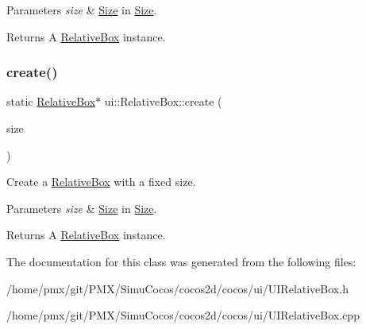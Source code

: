 \begin{DoxyParams}{Parameters}
{\em size} & \hyperlink{classSize}{Size} in {\ttfamily \hyperlink{classSize}{Size}}. \\
\hline
\end{DoxyParams}
\begin{DoxyReturn}{Returns}
A \hyperlink{classui_1_1RelativeBox}{Relative\+Box} instance. 
\end{DoxyReturn}
\mbox{\label{classui_1_1RelativeBox_a2e368badd32439b98017bcd362e5c413}} 
\subsubsection{\texorpdfstring{create()}{create()}\hspace{0.1cm}{\footnotesize\ttfamily [4/4]}}
{\footnotesize\ttfamily static \hyperlink{classui_1_1RelativeBox}{Relative\+Box}$\ast$ ui\+::\+Relative\+Box\+::create (\begin{DoxyParamCaption}\item[{const \hyperlink{classSize}{Size} \&}]{size }\end{DoxyParamCaption})\hspace{0.3cm}{\ttfamily [static]}}



Create a \hyperlink{classui_1_1RelativeBox}{Relative\+Box} with a fixed size. 


\begin{DoxyParams}{Parameters}
{\em size} & \hyperlink{classSize}{Size} in {\ttfamily \hyperlink{classSize}{Size}}. \\
\hline
\end{DoxyParams}
\begin{DoxyReturn}{Returns}
A \hyperlink{classui_1_1RelativeBox}{Relative\+Box} instance. 
\end{DoxyReturn}


The documentation for this class was generated from the following files\+:\begin{DoxyCompactItemize}
\item 
/home/pmx/git/\+P\+M\+X/\+Simu\+Cocos/cocos2d/cocos/ui/U\+I\+Relative\+Box.\+h\item 
/home/pmx/git/\+P\+M\+X/\+Simu\+Cocos/cocos2d/cocos/ui/U\+I\+Relative\+Box.\+cpp\end{DoxyCompactItemize}
